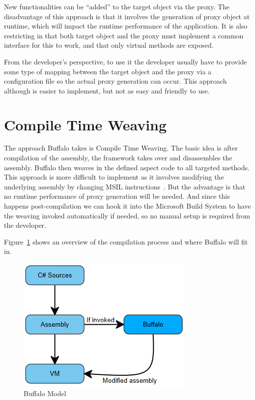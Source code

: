 New functionalities can be “added” to the target object via the proxy. The disadvantage of this approach is that it involves the generation of proxy object at runtime, which will impact the runtime performance of the application. It is also restricting in that both target object and the proxy must implement a common interface for this to work, and that only virtual methods are exposed.

From the developer's perspective, to use it the developer usually have to provide some type of mapping between the target object and the proxy via a configuration file so the actual proxy generation can occur. This approach although is easier to implement, but not as easy and friendly to use.

\section{Compile Time Weaving}

The approach Buffalo takes is Compile Time Weaving. The basic idea is after compilation of the assembly, the framework takes over and disassembles the assembly. Buffalo then weaves in the defined aspect code to all targeted methods. This approach is more difficult to implement as it involves modifying the underlying assembly by changing MSIL instructions~\cite{rewrite_msil}. But the advantage is that no runtime performance of proxy generation will be needed. And since this happens post-compilation we can hook it into the Microsoft Build System to have the weaving invoked automatically if needed, so no manual setup is required from the developer.

Figure~\ref{buffalo_model} shows an overview of the compilation process and where Buffalo will fit in.

\begin{figure}[H]
  \includegraphics[scale=1.0]{BuffaloOverview.PNG}
  \centering
  \caption{Buffalo Model\label{buffalo_model}}
\end{figure}

